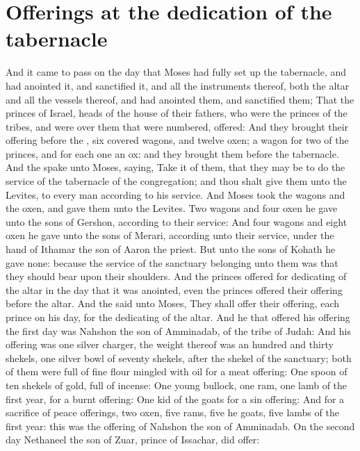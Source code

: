 \section*{Offerings at the dedication of the tabernacle}
\begin{biblechapter} %
\verse And it came to pass on the day that Moses had fully set up the tabernacle, and had anointed it, and sanctified it, and all the instruments thereof, both the altar and all the vessels thereof, and had anointed them, and sanctified them;
\verse That the princes of Israel, heads of the house of their fathers, who were the princes of the tribes, and were over them that were numbered, offered:
\verse And they brought their offering before the \LORD, six covered wagons, and twelve oxen; a wagon for two of the princes, and for each one an ox: and they brought them before the tabernacle.
\verse And the \LORD spake unto Moses, saying,
\verse Take it of them, that they may be to do the service of the tabernacle of the congregation; and thou shalt give them unto the Levites, to every man according to his service.
\verse And Moses took the wagons and the oxen, and gave them unto the Levites.
\verse Two wagons and four oxen he gave unto the sons of Gershon, according to their service:
\verse And four wagons and eight oxen he gave unto the sons of Merari, according unto their service, under the hand of Ithamar the son of Aaron the priest.
\verse But unto the sons of Kohath he gave none: because the service of the sanctuary belonging unto them was that they should bear upon their shoulders.
\verse And the princes offered for dedicating of the altar in the day that it was anointed, even the princes offered their offering before the altar.
\verse And the \LORD said unto Moses, They shall offer their offering, each prince on his day, for the dedicating of the altar.
\verse And he that offered his offering the first day was Nahshon the son of Amminadab, of the tribe of Judah:
\verse And his offering was one silver charger, the weight thereof was an hundred and thirty shekels, one silver bowl of seventy shekels, after the shekel of the sanctuary; both of them were full of fine flour mingled with oil for a meat offering:
\verse One spoon of ten shekels of gold, full of incense:
\verse One young bullock, one ram, one lamb of the first year, for a burnt offering:
\verse One kid of the goats for a sin offering:
\verse And for a sacrifice of peace offerings, two oxen, five rams, five he goats, five lambs of the first year: this was the offering of Nahshon the son of Amminadab.
\verse On the second day Nethaneel the son of Zuar, prince of Issachar, did offer:

\end{biblechapter}
